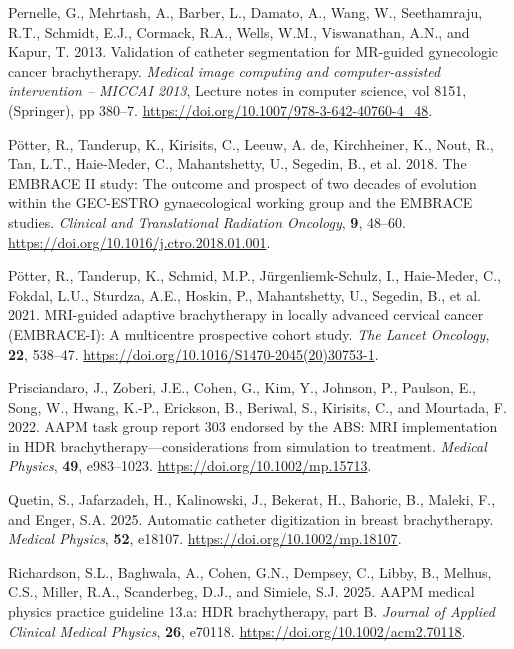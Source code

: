 \documentclass[
  11pt,
]{article}
\newlength{\cslhangindent}
\newenvironment{CSLReferences}[2] %
 {\begin{list}{}{%
  \setlength{\itemindent}{0pt}
  \setlength{\leftmargin}{0pt}
  \setlength{\parsep}{0pt}
  \ifodd #1
   \setlength{\leftmargin}{\cslhangindent}
   \setlength{\itemindent}{-1\cslhangindent}
  \fi
  \setlength{\itemsep}{#2\baselineskip}}}
 {\end{list}}
\begin{document}
\begin{CSLReferences}{1}{1}
Pernelle, G., Mehrtash, A., Barber, L., Damato, A., Wang, W.,
Seethamraju, R.T., Schmidt, E.J., Cormack, R.A., Wells, W.M.,
Viswanathan, A.N., and Kapur, T. 2013. Validation of catheter
segmentation for {MR}-guided gynecologic cancer brachytherapy.
\emph{Medical image computing and computer-assisted intervention --
MICCAI 2013}, Lecture notes in computer science, vol 8151, (Springer),
pp 380--7. \url{https://doi.org/10.1007/978-3-642-40760-4_48}.

Pötter, R., Tanderup, K., Kirisits, C., Leeuw, A. de, Kirchheiner, K.,
Nout, R., Tan, L.T., Haie-Meder, C., Mahantshetty, U., Segedin, B., et
al. 2018. The {EMBRACE II} study: The outcome and prospect of two
decades of evolution within the {GEC-ESTRO} gynaecological working group
and the {EMBRACE} studies. \emph{Clinical and Translational Radiation
Oncology}, \textbf{9}, 48--60.
\url{https://doi.org/10.1016/j.ctro.2018.01.001}.

Pötter, R., Tanderup, K., Schmid, M.P., Jürgenliemk-Schulz, I.,
Haie-Meder, C., Fokdal, L.U., Sturdza, A.E., Hoskin, P., Mahantshetty,
U., Segedin, B., et al. 2021. {MRI}-guided adaptive brachytherapy in
locally advanced cervical cancer ({EMBRACE-I}): A multicentre
prospective cohort study. \emph{The Lancet Oncology}, \textbf{22},
538--47. \url{https://doi.org/10.1016/S1470-2045(20)30753-1}.

Prisciandaro, J., Zoberi, J.E., Cohen, G., Kim, Y., Johnson, P.,
Paulson, E., Song, W., Hwang, K.-P., Erickson, B., Beriwal, S.,
Kirisits, C., and Mourtada, F. 2022. {AAPM} task group report 303
endorsed by the {ABS}: {MRI} implementation in {HDR}
brachytherapy---considerations from simulation to treatment.
\emph{Medical Physics}, \textbf{49}, e983--1023.
\url{https://doi.org/10.1002/mp.15713}.

Quetin, S., Jafarzadeh, H., Kalinowski, J., Bekerat, H., Bahoric, B.,
Maleki, F., and Enger, S.A. 2025. Automatic catheter digitization in
breast brachytherapy. \emph{Medical Physics}, \textbf{52}, e18107.
\url{https://doi.org/10.1002/mp.18107}.

Richardson, S.L., Baghwala, A., Cohen, G.N., Dempsey, C., Libby, B.,
Melhus, C.S., Miller, R.A., Scanderbeg, D.J., and Simiele, S.J. 2025.
{AAPM} medical physics practice guideline 13.a: {HDR} brachytherapy,
part {B}. \emph{Journal of Applied Clinical Medical Physics},
\textbf{26}, e70118. \url{https://doi.org/10.1002/acm2.70118}.


\end{CSLReferences}
\end{document}
